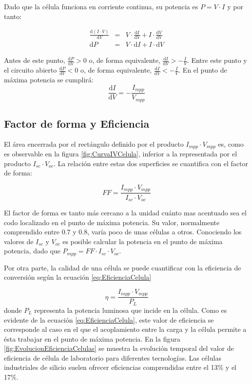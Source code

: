 Dado que la célula funciona en corriente continua, su potencia es
$P=V\cdot I$ y por tanto:

\begin{eqnarray}
\frac{\mathrm{d}(I\cdot V)}{\mathrm{d}V} & = & V\cdot\frac{\mathrm{d}I}{\mathrm{d}V}+I\cdot\frac{\mathrm{d}V}{\mathrm{d}V}\nonumber \\
\mathrm{d}P & = & V\cdot\mathrm{d}I+I\cdot\mathrm{d}V\end{eqnarray}


Antes de este punto, $\frac{\mathrm{d}P}{\mathrm{d}V}>0$ o, de
forma equivalente, $\frac{\mathrm{d}I}{\mathrm{d}V}>-\frac{I}{V}$.
Entre este punto y el circuito abierto $\frac{\mathrm{d}P}{\mathrm{d}V}<0$
o, de forma equivalente, $\frac{\mathrm{d}I}{\mathrm{d}V}<-\frac{I}{V}$.
En el punto de máxima potencia se cumplirá:\begin{equation}
\frac{\mathrm{d}I}{\mathrm{d}V}=-\frac{I_{mpp}}{V_{mpp}}\label{eq:MPP_derivada}\end{equation}



\subsection{Factor de forma y Eficiencia}

El área encerrada por el rectángulo definido por el producto $I_{mpp}\cdot V_{mpp}$
es, como es observable en la figura \ref{fig:CurvaIVCelula}, inferior
a la representada por el producto $I_{sc}\cdot V_{oc}$. La relación
entre estas dos superficies se cuantifica con el factor de forma:

\begin{equation}
FF=\frac{I_{mpp}\cdot V_{mpp}}{I_{sc}\cdot V_{oc}}\label{eq:FactorForma}\end{equation}

El factor de forma es tanto más cercano a la unidad cuánto mas acentuado
sea el codo localizado en el punto de máxima potencia. Su valor, normalmente
comprendido entre $0.7$ y $0.8$, varía poco de unas células a otros.
Conociendo los valores de $I_{sc}$ y $V_{oc}$ es posible calcular
la potencia en el punto de máxima potencia, dado que $P_{mpp}=FF\cdot I_{sc}\cdot V_{oc}$.

Por otra parte, la calidad de una célula se puede cuantificar con
la eficiencia de conversión según la ecuación \ref{eq:EficienciaCelula}

\begin{equation}
\eta=\frac{I_{mpp}\cdot V_{mpp}}{P_{L}}\label{eq:EficienciaCelula}\end{equation}
donde $P_{L}$ representa la potencia luminosa que incide en la célula.
Como es evidente de la ecuación \ref{eq:EficienciaCelula}, este valor
de eficiencia se corresponde al caso en el que el acoplamiento entre
la carga y la célula permite a ésta trabajar en el punto de máxima
potencia. En la figura \ref{fig:EvolucionEficienciaCelulas}
se muestra la evolución temporal del valor de eficiencia de célula
de laboratorio para diferentes tecnologías. Las células industriales
de silicio suelen ofrecer eficiencias comprendidas entre el 13\% y
el 17\%.

